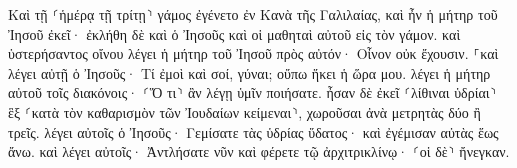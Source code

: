 \documentclass{openreader}
\begin{document}
Καὶ τῇ ⸂ἡμέρᾳ τῇ τρίτῃ⸃ γάμος ἐγένετο ἐν Κανὰ τῆς Γαλιλαίας, καὶ ἦν ἡ μήτηρ τοῦ Ἰησοῦ ἐκεῖ· 
ἐκλήθη δὲ καὶ ὁ Ἰησοῦς καὶ οἱ μαθηταὶ αὐτοῦ εἰς τὸν γάμον. 
καὶ ὑστερήσαντος οἴνου λέγει ἡ μήτηρ τοῦ Ἰησοῦ πρὸς αὐτόν· Οἶνον οὐκ ἔχουσιν. 
⸀καὶ λέγει αὐτῇ ὁ Ἰησοῦς· Τί ἐμοὶ καὶ σοί, γύναι; οὔπω ἥκει ἡ ὥρα μου. 
λέγει ἡ μήτηρ αὐτοῦ τοῖς διακόνοις· ⸂Ὅ τι⸃ ἂν λέγῃ ὑμῖν ποιήσατε. 
ἦσαν δὲ ἐκεῖ ⸂λίθιναι ὑδρίαι⸃ ἓξ ⸂κατὰ τὸν καθαρισμὸν τῶν Ἰουδαίων κείμεναι⸃, χωροῦσαι ἀνὰ μετρητὰς δύο ἢ τρεῖς. 
λέγει αὐτοῖς ὁ Ἰησοῦς· Γεμίσατε τὰς ὑδρίας ὕδατος· καὶ ἐγέμισαν αὐτὰς ἕως ἄνω. 
καὶ λέγει αὐτοῖς· Ἀντλήσατε νῦν καὶ φέρετε τῷ ἀρχιτρικλίνῳ· ⸂οἱ δὲ⸃ ἤνεγκαν. 
\end{document}
